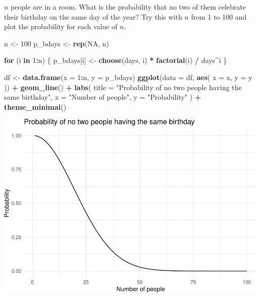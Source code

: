 \documentclass[
]{article}
\newenvironment{Shaded}{\begin{snugshade}}{\end{snugshade}}
\newcommand{\ControlFlowTok}[1]{\textcolor[rgb]{0.13,0.29,0.53}{\textbf{#1}}}
\newcommand{\DataTypeTok}[1]{\textcolor[rgb]{0.13,0.29,0.53}{#1}}
\newcommand{\DecValTok}[1]{\textcolor[rgb]{0.00,0.00,0.81}{#1}}
\newcommand{\KeywordTok}[1]{\textcolor[rgb]{0.13,0.29,0.53}{\textbf{#1}}}
\newcommand{\NormalTok}[1]{#1}
\newcommand{\OperatorTok}[1]{\textcolor[rgb]{0.81,0.36,0.00}{\textbf{#1}}}
\newcommand{\OtherTok}[1]{\textcolor[rgb]{0.56,0.35,0.01}{#1}}
\newcommand{\StringTok}[1]{\textcolor[rgb]{0.31,0.60,0.02}{#1}}
\begin{document}
\(n\) people are in a room. What is the probability that no two of them
celebrate their birthday on the same day of the year? Try this with
\(n\) from 1 to 100 and plot the probability for each value of \(n\).

\begin{Shaded}
\begin{Highlighting}[]
\NormalTok{n \textless{}{-}}\StringTok{ }\DecValTok{100}
\NormalTok{p\_bdays \textless{}{-}}\StringTok{ }\KeywordTok{rep}\NormalTok{(}\OtherTok{NA}\NormalTok{, n)}

\ControlFlowTok{for}\NormalTok{ (i }\ControlFlowTok{in} \DecValTok{1}\OperatorTok{:}\NormalTok{n) \{}
\NormalTok{  p\_bdays[i] \textless{}{-}}\StringTok{ }\KeywordTok{choose}\NormalTok{(days, i) }\OperatorTok{*}\StringTok{ }\KeywordTok{factorial}\NormalTok{(i) }\OperatorTok{/}\StringTok{ }\NormalTok{days}\OperatorTok{\^{}}\NormalTok{i}
\NormalTok{\}}

\NormalTok{df \textless{}{-}}\StringTok{ }\KeywordTok{data.frame}\NormalTok{(}\DataTypeTok{x =} \DecValTok{1}\OperatorTok{:}\NormalTok{n, }\DataTypeTok{y =}\NormalTok{ p\_bdays)}
\KeywordTok{ggplot}\NormalTok{(}\DataTypeTok{data =}\NormalTok{ df, }\KeywordTok{aes}\NormalTok{(}
  \DataTypeTok{x =}\NormalTok{ x, }\DataTypeTok{y =}\NormalTok{ y}
\NormalTok{)) }\OperatorTok{+}
\StringTok{  }\KeywordTok{geom\_line}\NormalTok{() }\OperatorTok{+}
\StringTok{  }\KeywordTok{labs}\NormalTok{(}
    \DataTypeTok{title =} \StringTok{"Probability of no two people having the same birthday"}\NormalTok{,}
    \DataTypeTok{x =} \StringTok{"Number of people"}\NormalTok{, }\DataTypeTok{y =} \StringTok{"Probability"}
\NormalTok{  ) }\OperatorTok{+}
\StringTok{  }\KeywordTok{theme\_minimal}\NormalTok{()}
\end{Highlighting}
\end{Shaded}

\includegraphics{es_files/figure-latex/unnamed-chunk-14-1.pdf}
\end{document}
